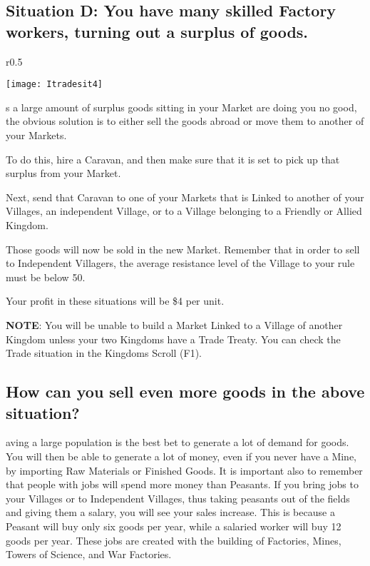 \subsection{\textsf{Situation D: You have many skilled Factory workers, turning out a surplus of goods.}}

\begin{wrapfigure}{r}{0.5\textwidth}
    \vspace{-20pt}
    \begin{center}
        \texttt{[image: Itradesit4]} %
    \end{center}
    \vspace{-20pt}
\end{wrapfigure}

s a large amount of surplus goods sitting in your Market are doing you no good, the obvious solution is to either sell the goods abroad or move them to another of your Markets.

To do this, hire a Caravan, and then make sure that it is set to pick up that surplus from your Market.


Next, send that Caravan to one of your Markets that is Linked to another of your Villages, an independent Village, or to a Village belonging to a Friendly or Allied Kingdom.

Those goods will now be sold in the new Market. Remember that in order to sell to Independent Villagers, the average resistance level of the Village to your rule must be below 50.

Your profit in these situations will be \$4 per unit.

\textbf{NOTE}: You will be unable to build a Market Linked to a Village of another Kingdom unless your two Kingdoms have a Trade Treaty. You can check the Trade situation in the Kingdoms Scroll (F1).

\subsection{\textsf{How can you sell even more goods in the above situation?}}

aving a large population is the best bet to generate a lot of demand for goods. You will then be able to generate a lot of money, even if you never have a Mine, by importing Raw Materials or Finished Goods. It is important also to remember that people with jobs will spend more money than Peasants. If you bring jobs to your Villages or to Independent Villages, thus taking peasants out of the fields and giving them a salary, you will see your sales increase. This is because a Peasant will buy only six goods per year, while a salaried worker will buy 12 goods per year. These jobs are created with the building of Factories, Mines, Towers of Science, and War Factories.


